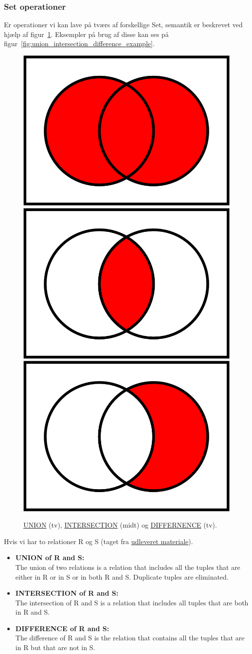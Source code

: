 \subsubsection{Set operationer}

Er operationer vi kan lave på tværs af forskellige Set, semantik er beskrevet ved hjælp af figur~\ref{fig:union_intersection_difference}. Eksempler på brug af disse kan ses på figur~\ref{fig:union_intersection_difference_example}.

\begin{figure}[H]
	\centering
	\includegraphics[width=.3\textwidth]{figs/spm6/union}\hfill
	\includegraphics[width=.3\textwidth]{figs/spm6/intersection}\hfill
	\includegraphics[width=.3\textwidth]{figs/spm6/difference}
	
	\caption{\href{https://en.wikipedia.org/wiki/Union_(set_theory)}{UNION} (tv), \href{https://en.wikipedia.org/wiki/Intersection_(set_theory)}{INTERSECTION} (midt) og \href{https://en.wikipedia.org/wiki/Complement_(set_theory)}{DIFFERNENCE} (tv).}
	\label{fig:union_intersection_difference}	
\end{figure}

Hvis vi har to relationer R og S (taget fra \href{http://db.grussell.org/section010.html#_Toc67114476}{udleveret materiale}). 

\begin{itemize}
	
	\item \textbf{UNION of R and S:}\\
	The union of two relations is a relation that includes all the tuples that are either in R or in S or in both R and S. Duplicate tuples are eliminated.
	
	\item \textbf{INTERSECTION of R and S:}\\
	The intersection of R and S is a relation that includes all tuples that are both in R and S.
	
	\item \textbf{DIFFERENCE of R and S:}\\
	The difference of R and S is the relation that contains all the tuples that are in R but that are not in S.
\end{itemize}

